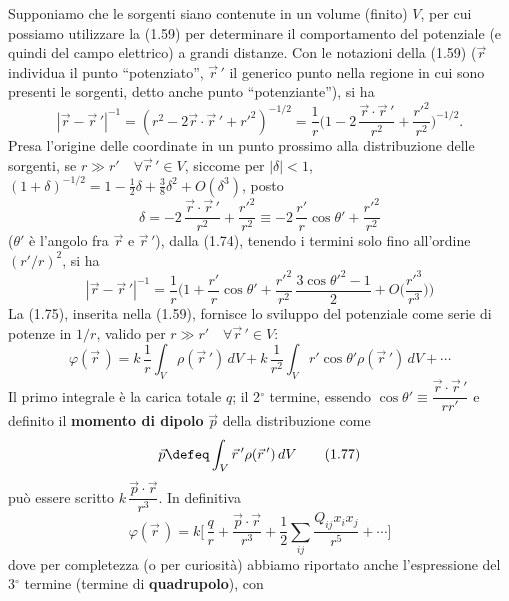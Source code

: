 Supponiamo che le sorgenti siano contenute in un volume (finito) $V$, per cui possiamo utilizzare la (1.59) per determinare il comportamento del potenziale (e quindi del campo elettrico) a grandi distanze. Con le notazioni della (1.59) ($\vec r$ individua il punto ``potenziato'', $\vec r\,'$ il generico punto nella regione in cui sono presenti le sorgenti, detto anche punto ``potenziante''), si ha
\begin{equation}
|\vec r-\vec r\,'|^{-1}=(r^2-2\vec r\cdot\vec r\,'+r'^2)^{-1/2}=\frac1r\Big(1-2\,\frac{\vec r\cdot\vec r\,'}{r^2}+\frac{r'^2}{r^2}\Big)^{-1/2}.
\tag{1.74}
\end{equation}
Presa l'origine delle coordinate in un punto prossimo alla distribuzione delle sorgenti, se $r\gg r'\quad\forall\vec r\,'\in V$, siccome per $|\delta|<1$, \ $(1+\delta)^{-1/2}=1-\frac12\delta+\frac38\delta^2+O(\delta^3)$, posto
\[
\delta=-2\,\frac{\vec r\cdot\vec r\,'}{r^2}+\frac{r'^2}{r^2}\equiv-2\,\frac{r'}{r}\cos\theta'+\frac{r'^2}{r^2}
\]
($\theta'$ è l'angolo fra $\vec r$ e $\vec r\,'$), dalla (1.74), tenendo i termini solo fino all'ordine $(r'/r)^2$, si ha
\begin{equation}
|\vec r-\vec r\,'|^{-1}=\frac1r\Big(1+\frac{r'}{r}\cos\theta'+\frac{r'^2}{r^2}\,\frac{3\cos\theta'^2-1}{2}+O\big(\frac{r'^3}{r^3}\big)\Big)
\tag{1.75}
\end{equation}
La (1.75), inserita nella (1.59), fornisce lo sviluppo del potenziale come serie di potenze in $1/r$, valido per $r\gg r'\quad\forall\vec r\,'\in V$:
\begin{equation}
\varphi(\vec r\,)=k\,\frac1r\int_V\rho(\vec r\,')\,dV+k\,\frac{1}{r^2}\int_Vr'\cos\theta'\rho(\vec r\,')\,dV+\cdots
\tag{1.76}
\end{equation}
Il primo integrale è la carica totale $q$; il 2$^\circ$ termine, essendo $\cos\theta'\equiv\dfrac{\vec r\cdot\vec r\,'}{rr'}$ e definito il \textbf{momento di dipolo} $\vec p$ della distribuzione come
\begin{equation}
\vec p\defeq\int_V\vec r\,'\rho(\vec r\,')\,dV
\tag{1.77}
\end{equation}
può essere scritto $k\,\dfrac{\vec p\cdot\vec r}{r^3}$. In definitiva
\begin{equation}
\varphi(\vec r\,)=k\Big[\,\frac qr+\frac{\vec p\cdot\vec r}{r^3}+\frac12\sum_{ij}\frac{Q_{ij}x_ix_j}{r^5}+\cdots\Big]
\tag{1.78}
\end{equation}
dove per completezza (o per curiosità) abbiamo riportato anche l'espressione del 3$^\circ$ termine (termine di \textbf{quadrupolo}), con
